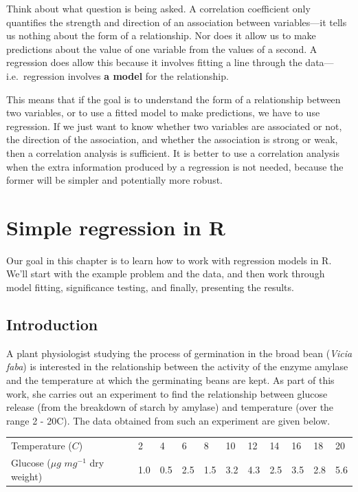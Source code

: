 \documentclass[
]{book}
\begin{document}
Think about what question is being asked. A correlation coefficient only quantifies the strength and direction of an association between variables---it tells us nothing about the form of a relationship. Nor does it allow us to make predictions about the value of one variable from the values of a second. A regression does allow this because it involves fitting a line through the data---i.e.~regression involves \textbf{a model} for the relationship.

This means that if the goal is to understand the form of a relationship between two variables, or to use a fitted model to make predictions, we have to use regression. If we just want to know whether two variables are associated or not, the direction of the association, and whether the association is strong or weak, then a correlation analysis is sufficient. It is better to use a correlation analysis when the extra information produced by a regression is not needed, because the former will be simpler and potentially more robust.

\hypertarget{regression-in-R}{%
\chapter{Simple regression in R}\label{regression-in-R}}

Our goal in this chapter is to learn how to work with regression models in R. We'll start with the example problem and the data, and then work through model fitting, significance testing, and finally, presenting the results.

\hypertarget{introduction-2}{%
\section{Introduction}\label{introduction-2}}

A plant physiologist studying the process of germination in the broad bean (\emph{Vicia faba}) is interested in the relationship between the activity of the enzyme amylase and the temperature at which the germinating beans are kept. As part of this work, she carries out an experiment to find the relationship between glucose release (from the breakdown of starch by amylase) and temperature (over the range 2 - 20C). The data obtained from such an experiment are given below.

\begin{longtable}[]{@{}lllllllllll@{}}
\toprule
& & & & & & & & & & \\
\midrule
\endhead
Temperature (\(C\)) & 2 & 4 & 6 & 8 & 10 & 12 & 14 & 16 & 18 & 20 \\
Glucose (\(\mu g\) \(mg^{-1}\) dry weight) & 1.0 & 0.5 & 2.5 & 1.5 & 3.2 & 4.3 & 2.5 & 3.5 & 2.8 & 5.6 \\
\bottomrule
\end{longtable}
\end{document}
